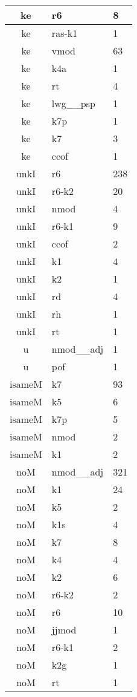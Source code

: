 \documentclass[a4 paper]{article}
\begin{document}
\begin{longtable}{cp{}p{}}
ke & r6 & 8\\ \midrule ke & ras-k1 & 1\\ \midrule ke & vmod & 63\\ \midrule ke & k4a & 1\\ \midrule ke & rt & 4\\ \midrule ke & lwg\_\_psp & 1\\ \midrule ke & k7p & 1\\ \midrule ke & k7 & 3\\ \midrule ke & ccof & 1\\ \midrule 
unkI & r6 & 238\\ \midrule unkI & r6-k2 & 20\\ \midrule unkI & nmod & 4\\ \midrule unkI & r6-k1 & 9\\ \midrule unkI & ccof & 2\\ \midrule unkI & k1 & 4\\ \midrule unkI & k2 & 1\\ \midrule unkI & rd & 4\\ \midrule unkI & rh & 1\\ \midrule unkI & rt & 1\\ \midrule 
u & nmod\_\_adj & 1\\ \midrule u & pof & 1\\ \midrule 
isameM & k7 & 93\\ \midrule isameM & k5 & 6\\ \midrule isameM & k7p & 5\\ \midrule isameM & nmod & 2\\ \midrule isameM & k1 & 2\\ \midrule 
noM & nmod\_\_adj & 321\\ \midrule noM & k1 & 24\\ \midrule noM & k5 & 2\\ \midrule noM & k1s & 4\\ \midrule noM & k7 & 8\\ \midrule noM & k4 & 4\\ \midrule noM & k2 & 6\\ \midrule noM & r6-k2 & 2\\ \midrule noM & r6 & 10\\ \midrule noM & jjmod & 1\\ \midrule noM & r6-k1 & 2\\ \midrule noM & k2g & 1\\ \midrule noM & rt & 1\\ \midrule 

\end{longtable}
\end{document}

